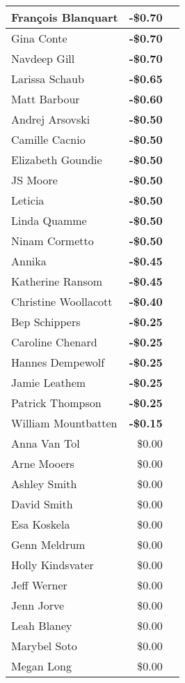 \begin{longtable}{|l|r|c|}
Fran\c{c}ois Blanquart & \textbf{-\$0.70} & \\\hline
Gina Conte & \textbf{-\$0.70} & \\\hline
Navdeep Gill & \textbf{-\$0.70} & \\\hline
Larissa Schaub & \textbf{-\$0.65} & \\\hline
Matt Barbour & \textbf{-\$0.60} & \\\hline
Andrej Arsovski & \textbf{-\$0.50} & \\\hline
Camille Cacnio & \textbf{-\$0.50} & \\\hline
Elizabeth Goundie & \textbf{-\$0.50} & \\\hline
JS Moore & \textbf{-\$0.50} & \\\hline
Leticia & \textbf{-\$0.50} & \\\hline
Linda Quamme & \textbf{-\$0.50} & \\\hline
Ninam Cormetto & \textbf{-\$0.50} & \\\hline
Annika & \textbf{-\$0.45} & \\\hline
Katherine Ransom & \textbf{-\$0.45} & \\\hline
Christine Woollacott & \textbf{-\$0.40} & \\\hline
Bep Schippers & \textbf{-\$0.25} & \\\hline
Caroline Chenard & \textbf{-\$0.25} & \\\hline
Hannes Dempewolf & \textbf{-\$0.25} & \\\hline
Jamie Leathem & \textbf{-\$0.25} & \\\hline
Patrick Thompson & \textbf{-\$0.25} & \\\hline
William Mountbatten & \textbf{-\$0.15} & \\\hline
Anna Van Tol & \$0.00 & \\\hline
Arne Mooers & \$0.00 & \\\hline
Ashley Smith & \$0.00 & \\\hline
David Smith & \$0.00 & \\\hline
Esa Koskela & \$0.00 & \\\hline
Genn Meldrum & \$0.00 & \\\hline
Holly Kindsvater & \$0.00 & \\\hline
Jeff Werner & \$0.00 & \\\hline
Jenn Jorve & \$0.00 & \\\hline
Leah Blaney & \$0.00 & \\\hline
Marybel Soto & \$0.00 & \\\hline
Megan Long & \$0.00 & \\\hline

\end{longtable}
